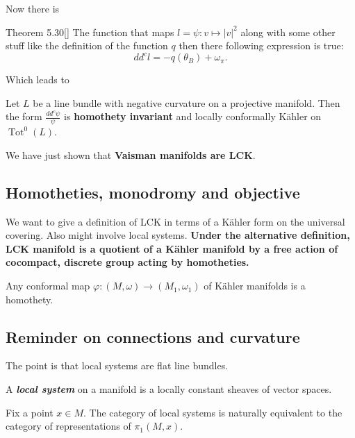 Now there is 

\begin{thing6}{Theorem 5.30}[\cite{verbi}]\leavevmode
The function that maps \(l=\psi:v \mapsto |v|^2\) along with some other stuff like the definition of the function \(q\) then there following expression is true:
\[d d^c l=-q(\theta_B)+\omega_\pi.\]
\end{thing6}

Which leads to

\begin{coro}\leavevmode
	Let \(L\) be a line bundle with negative curvature on a projective manifold. Then the form \(\frac{ d d^c\psi}{\psi}\) is \textbf{homothety invariant} and locally conformally Kähler on \(\operatorname{Tot}^0(L)\).
\end{coro}

\begin{remark}\leavevmode
	We have just shown that \textbf{Vaisman manifolds are LCK}.
\end{remark}

\subsection{Homotheties, monodromy and objective}

We want to give a definition of LCK in terms of a Kähler form on the universal covering. Also might involve local systems. \textbf{Under the alternative definition, LCK manifold is a quotient of a Kähler manifold by a free action of cocompact, discrete group acting by homotheties.}

\begin{claim}\leavevmode
	Any conformal map \(\varphi:(M,\omega) \to (M_1,\omega_1)\) of Kähler manifolds is a homothety.
\end{claim}

\subsection{Reminder on connections and curvature}

The point is that local systems are flat line bundles.

\begin{defn}\leavevmode
	A \textit{\textbf{local system}} on a manifold is a locally constant sheaves of vector spaces.
\end{defn}

\begin{thm}\leavevmode
Fix a point \(x \in M\). The category of local systems is naturally equivalent to the category of representations of \(\pi_1(M,x)\).
\end{thm}

